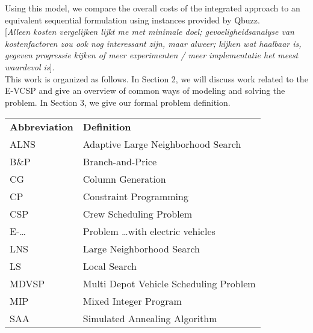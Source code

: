 \documentclass[]{article}
\newcommand{\todonocomment}[1]{{\color{red}[\textit{#1}]}}
\begin{document}
Using this model, we compare the overall costs of the integrated approach to an equivalent sequential formulation using instances provided by Qbuzz. \\
\todonocomment{Alleen kosten vergelijken lijkt me met minimale doel; gevoeligheidsanalyse van kostenfactoren zou ook nog interessant zijn, maar alweer; kijken wat haalbaar is, gegeven progressie kijken of meer experimenten / meer implementatie het meest waardevol is}. \\
This work is organized as follows. In Section 2, we will discuss work related to the E-VCSP and give an overview of common ways of modeling and solving the problem. In Section 3, we give our formal problem definition.
\begin{table}
  \centering
  \begin{tabular}{ll}
    \toprule
    \multicolumn{1}{l}{\textbf{Abbreviation}} & \multicolumn{1}{l}{\textbf{Definition}}               \\
    \cmidrule(lr){1-1}\cmidrule(lr){2-2}
    ALNS                                      & Adaptive Large Neighborhood Search                   \\
    B\&P                                      & Branch-and-Price                                      \\
    CG                                        & Column Generation                                     \\
    CP                                        & Constraint Programming                                \\
    CSP                                       & Crew Scheduling Problem                               \\
    E-\dots                                   & Problem \dots with electric vehicles                  \\
    LNS                                       & Large Neighborhood Search                            \\
    LS                                        & Local Search                                          \\
    MDVSP                                     & Multi Depot Vehicle Scheduling Problem                \\
    MIP                                       & Mixed Integer Program                                 \\
    SAA                                       & Simulated Annealing Algorithm                         \\

\end{tabular}
\end{table}
\end{document}
